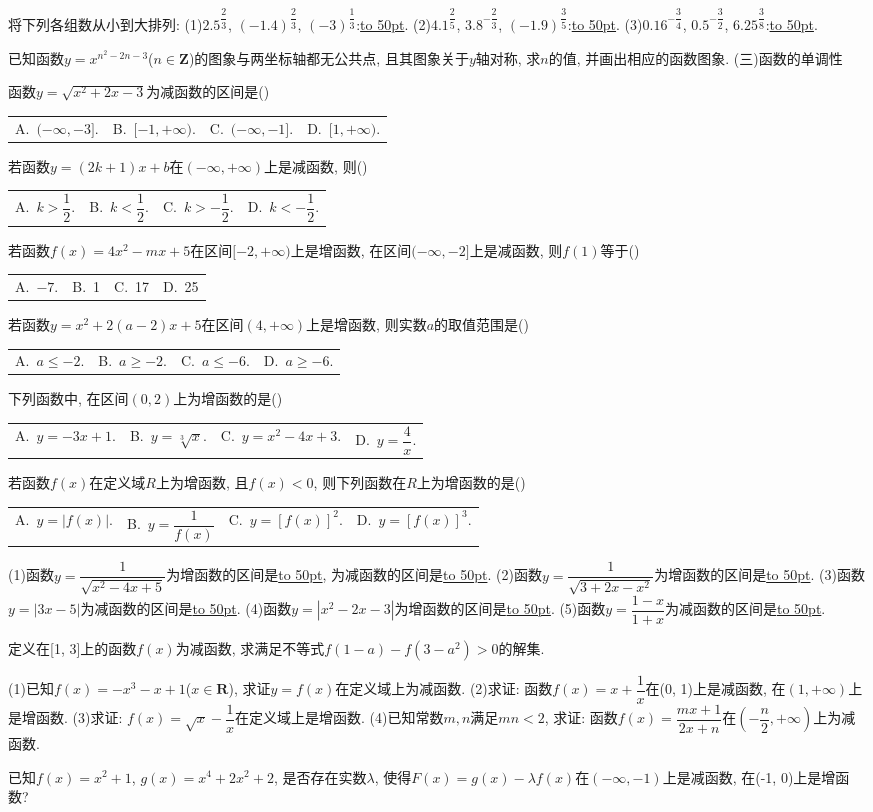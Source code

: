 \documentclass[10pt,a4paper]{article}
\newcommand{\blank}[1]{\underline{\hbox to #1pt{}}}
\newcommand{\fourch}[4]{\par\begin{tabular}{p{.23\textwidth}p{.23\textwidth}p{.23\textwidth}p{.23\textwidth}}
A.~#1 &B.~#2& C.~#3& D.~#4
\end{tabular}}
\begin{document}
\begin{enumerate}[1.]
{{    \item 将下列各组数从小到大排列:
    (1)${{2.5}^{\dfrac 23}}$, ${{(-1.4)}^{\dfrac 23}}$, ${{(-3)}^{\dfrac 13}}$:\blank{50}.
    (2)${{4.1}^{\dfrac 25}}$, ${{3.8}^{-\dfrac 23}}$, ${{(-1.9)}^{\dfrac 35}}$:\blank{50}.
    (3)${{0.16}^{-\dfrac 34}}$, ${{0.5}^{-\dfrac 32}}$, ${{6.25}^{\dfrac 38}}$:\blank{50}.
    \item 已知函数$y={x^{n^2-2n-3}}$($n\in \mathbf{Z}$)的图象与两坐标轴都无公共点, 且其图象关于$y$轴对称, 求$n$的值, 并画出相应的函数图象.
    (三)函数的单调性
    \item 函数$y=\sqrt{{x^2}+2x-3}$为减函数的区间是()
    \fourch{$(-\infty ,-3 ].$}{$[ -1,+\infty).$}{$(-\infty ,-1 ].$}{$[ 1,+\infty).$}
    \item 若函数$y=(2k+1)x+b$在$(-\infty ,+\infty)$上是减函数, 则()
    \fourch{$k>\dfrac 12.$}{$k<\dfrac 12.$}{$k>-\dfrac 12.$}{$k<-\dfrac 12.$}
    \item 若函数$f(x)=4x^2-mx+5$在区间$[ -2,+\infty)$上是增函数, 在区间$(-\infty ,-2 ]$上是减函数, 则$f(1)$等于()
    \fourch{$-7.$}{1}{17}{25}
    \item 若函数$y=x^2+2(a-2)x+5$在区间$(4,+\infty)$上是增函数, 则实数$a$的取值范围是()
    \fourch{$a\le -2.$}{$a\ge -2.$}{$a\le -6.$}{$a\ge -6.$}
    \item 下列函数中, 在区间$(0,2)$上为增函数的是()
    \fourch{$y=-3x+1.$}{$y=\sqrt[3]x.$}{$y=x^2-4x+3.$}{$y=\dfrac 4x.$}
    \item 若函数$f(x)$在定义域$R$上为增函数, 且$f(x)<0$, 则下列函数在$R$上为增函数的是()
    \fourch{$y=|f(x)|.$}{$y=\dfrac 1{f(x)}$}{$y={{[ f(x) ]}^2}.$}{$y={{[ f(x) ]}^3}.$}
    \item (1)函数$y=\dfrac 1{\sqrt{{x^2}-4x+5}}$为增函数的区间是\blank{50}, 为减函数的区间是\blank{50}.
    (2)函数$y=\dfrac 1{\sqrt{3+2x-{x^2}}}$为增函数的区间是\blank{50}.
    (3)函数$y=|3x-5|$为减函数的区间是\blank{50}.
    (4)函数$y=|x^2-2x-3|$为增函数的区间是\blank{50}.
    (5)函数$y=\dfrac{1-x}{1+x}$为减函数的区间是\blank{50}.
    \item 定义在[1, 3]上的函数$f(x)$为减函数, 求满足不等式$f(1-a)-f(3-a^2)>0$的解集.
    \item (1)已知$f(x)=-x^3-x+1$($x\in \mathbf{R}$), 求证$y=f(x)$在定义域上为减函数.
    (2)求证: 函数$f(x)=x+\dfrac 1x$在(0, 1)上是减函数, 在$(1,+\infty)$上是增函数.
    (3)求证: $f(x)=\sqrt x-\dfrac 1x$在定义域上是增函数.
    (4)已知常数$m,n$满足$mn<2$, 求证: 函数$f(x)=\dfrac{mx+1}{2x+n}$在$(-\dfrac n2,+\infty)$上为减函数.
    \item 已知$f(x)=x^2+1$, $g(x)=x^4+2x^2+2$, 是否存在实数$\lambda$, 使得$F(x)=g(x)-\lambda f(x)$在$(-\infty ,-1)$上是减函数, 在(-1, 0)上是增函数?
}}
\end{enumerate}
\end{document}
